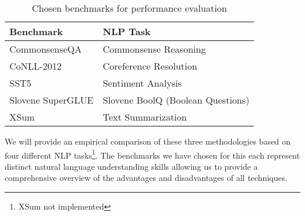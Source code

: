 \begin{table}[htbp]
  \centering
  \begin{tabularx}{\columnwidth}{lX}
    \toprule
    \textbf{Benchmark} & \textbf{NLP Task} \\
    \midrule
    CommonsenseQA \cite{talmor2019commonsenseqa} & Commonsense Reasoning \\
    CoNLL-2012 \cite{pradhan2012conll} & Coreference Resolution \\
    SST5 \cite{maas2011sentiment} & Sentiment Analysis \\
    Slovene SuperGLUE \cite{robnik2022superglue} & Slovene BoolQ (Boolean Questions) \\
    XSum \cite{narayan2018xsum} & Text Summarization \\
    \bottomrule
  \end{tabularx}
  \caption{Chosen benchmarks for performance evaluation}
  \label{tab:benchmarks}
\end{table}
We will provide an empirical comparison of these three methodologies based on four different NLP tasks\footnote{XSum not implemented}. The benchmarks we have chosen for this each represent distinct natural language understanding skills allowing us to provide a comprehensive overview of the advantages and disadvantages of all techniques.